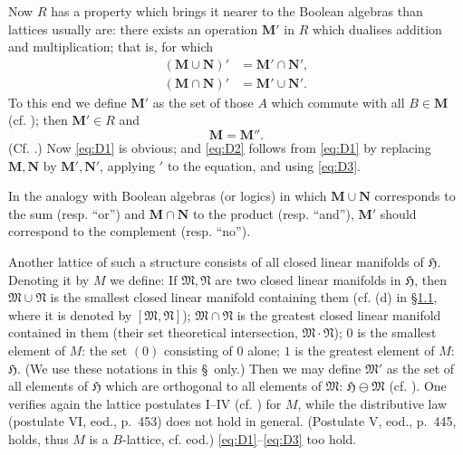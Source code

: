 \documentclass[12pt,b5paper,twoside]{article}
\newcommand{\Hspace}{\mathfrak H}
\newcommand{\M}{\mathbf M}
\newcommand{\N}{\mathbf N}
\newcommand{\secref}[1]{\hyperref[sec:#1]{\S#1}}
\begin{document}
Now $R$ has a property which brings it nearer to the Boolean algebras than
lattices usually are: there exists an operation $\M'$ in $R$ which dualises
addition and multiplication; that is, for which
\begin{align}
 (\M\cup\N)'&=\M'\cap\N', \tag{$D_1$}\label{eq:D1}\\
 (\M\cap\N)'&=\M'\cup\N'. \tag{$D_2$}\label{eq:D2}
\end{align}
To this end we define $\M'$ as the set of those $A$ which commute with all
$B\in\M$ (cf. \cite[p.~374]{ref18}); then $\M'\in R$ and
\begin{equation*}
 \M=\M''. \tag{$D_3$}\label{eq:D3}
\end{equation*}
(Cf. \cite[p.~397]{ref18}.) Now \eqref{eq:D1} is obvious; and
\eqref{eq:D2} follows from \eqref{eq:D1} by replacing $\M,\N$ by
$\M',\N'$, applying $'$ to the equation, and using \eqref{eq:D3}.

In the analogy with Boolean algebras (or logics) in which $\M\cup\N$
corresponds to the sum (resp. ``or'') and $\M\cap\N$ to the product (resp.
``and''), $\M'$ should correspond to the complement (resp. ``no'').

Another lattice of such a structure consists of all closed linear manifolds of
$\Hspace$. Denoting it by $M$ we define: If $\mathfrak M,\mathfrak N$ are two
closed linear manifolds in $\Hspace$, then $\mathfrak M\cup\mathfrak N$ is the
smallest closed linear manifold containing them (cf. (d) in \secref{1.1}, where
it is denoted by $[\mathfrak M,\mathfrak N]$); $\mathfrak M\cap\mathfrak N$
is the greatest closed linear manifold contained in them (their set theoretical
intersection, $\mathfrak M\cdot\mathfrak N$); $0$ is the smallest element of
$M$: the set $(0)$ consisting of $0$ alone; $1$ is the greatest element of $M$:
$\Hspace$. (We use these notations in this \hyperref[intro:2]{\S}\ only.)
Then we may define
$\mathfrak M'$ as the set of all elements of $\Hspace$ which are orthogonal to
all elements of $\mathfrak M$: $\Hspace\ominus\mathfrak M$
(cf. \cite[p.~74]{ref16}). One verifies again the lattice postulates I--IV
(cf. \cite[p.~422]{ref1}) for $M$, while the distributive law (postulate VI,
eod., p.~453) does not hold in general. (Postulate V, eod., p.~445, holds,
thus $M$ is a $B$-lattice, cf. eod.) \eqref{eq:D1}--\eqref{eq:D3} too hold.
\end{document}
